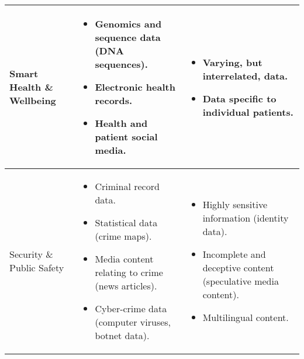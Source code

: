 \begin{landscape}
\begin{table}[H]
\begin{tabular}{ | p{4cm} | p{10cm} | p{10cm} | }
Smart Health \& Wellbeing
&
\begin{itemize}[leftmargin=*]
  \item Genomics and sequence data (DNA sequences).
  \item Electronic health records.
  \item Health and patient social media.
\end{itemize}
&
\begin{itemize}[leftmargin=*]
  \item Varying, but interrelated, data.
  \item Data specific to individual patients.
\end{itemize}
\\ \hline

Security \& Public Safety
&
\begin{itemize}[leftmargin=*]
  \item Criminal record data.
  \item Statistical data (crime maps).
  \item Media content relating to crime (news articles).
  \item Cyber-crime data (computer viruses, botnet data).
\end{itemize}
&
\begin{itemize}[leftmargin=*]
  \item Highly sensitive information (identity data).
  \item Incomplete and deceptive content (speculative media content).
  \item Multilingual content.
\end{itemize}
\\ \hline


\end{tabular}
\end{table}
\end{landscape}
